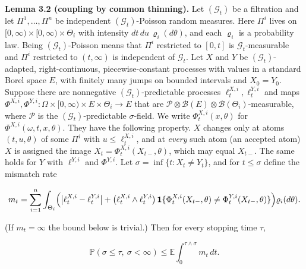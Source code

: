 \documentclass[
  british,
  11pt,
  a4paper,
]{article}
\begin{document}
\textbf{Lemma 3.2 (coupling by common thinning).} Let \((\mathcal G_t)\)
be a filtration and let \(\Pi^1,\ldots,\Pi^n\) be independent
\((\mathcal G_t)\)-Poisson random measures. Here \(\Pi^i\) lives on
\([0,\infty)\times[0,\infty)\times\Theta_i\) with intensity
\(dt\,du\,\varrho_i(d\theta)\), and each \(\varrho_i\) is a probability
law. Being \((\mathcal G_t)\)-Poisson means that \(\Pi^i\) restricted to
\([0,t]\) is \(\mathcal G_t\)-measurable and \(\Pi^i\) restricted to
\((t,\infty)\) is independent of \(\mathcal G_t\). Let \(X\) and \(Y\)
be \((\mathcal G_t)\)-adapted, right-continuous, piecewise-constant
processes with values in a standard Borel space \(E\), with finitely
many jumps on bounded intervals and \(X_0=Y_0\). Suppose there are
nonnegative \((\mathcal G_t)\)-predictable processes
\(\ell^{X,i}_t,\ell^{Y,i}_t\) and maps
\(\Phi^{X,i},\Phi^{Y,i}:\Omega\times[0,\infty)\times E\times\Theta_i\to E\)
that are
\(\mathcal P\otimes\mathcal B(E)\otimes\mathcal B(\Theta_i)\)-measurable,
where \(\mathcal P\) is the \((\mathcal G_t)\)-predictable
\(\sigma\)-field. We write \(\Phi^{X,i}_t(x,\theta)\) for
\(\Phi^{X,i}(\omega,t,x,\theta)\). They have the following property.
\(X\) changes only at atoms \((t,u,\theta)\) of some \(\Pi^i\) with
\(u\le\ell^{X,i}_t\), and at \emph{every} such atom (an accepted atom)
\(X\) is assigned the image \(X_t=\Phi^{X,i}_t(X_{t-},\theta)\), which
may equal \(X_{t-}\). The same holds for \(Y\) with \(\ell^{Y,i}\) and
\(\Phi^{Y,i}\). Let \(\sigma=\inf\{t:X_t\ne Y_t\}\), and for
\(t\le\sigma\) define the mismatch rate

\[
m_t=\sum_{i=1}^n\int_{\Theta_i}\Bigl(\bigl|\ell^{X,i}_t-\ell^{Y,i}_t\bigr|
+\bigl(\ell^{X,i}_t\wedge\ell^{Y,i}_t\bigr)\,
\mathbf 1\{\Phi^{X,i}_t(X_{t-},\theta)\ne\Phi^{Y,i}_t(X_{t-},\theta)\}\Bigr)\varrho_i(d\theta).
\]

(If \(m_t=\infty\) the bound below is trivial.) Then for every stopping
time \(\tau\),

\[
\mathbb P(\sigma\le\tau,\ \sigma<\infty)\le\mathbb E\int_0^{\tau\wedge\sigma}m_t\,dt.
\tag{14}
\]
\end{document}
